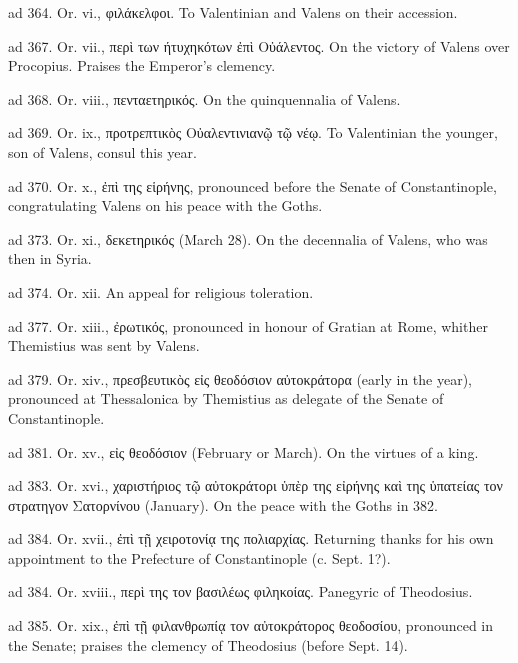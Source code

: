 ad 364.
Or. vi., \textgreek{φιλάκελφοι}. To Valentinian and Valens on their accession.

ad 367.
Or. vii., \textgreek{περ\texthebrew{ὶ} των ήτυχηκότων \texthebrew{ἐ}π\texthebrew{ὶ} Ο\texthebrew{ὐ}άλεντος}. On the victory of Valens over Procopius. Praises the Emperor\texthebrew{}’s clemency.

ad 368.
Or. viii., \textgreek{πενταετηρικός}. On the quinquennalia of Valens.

ad 369.
Or. ix., \textgreek{προτρεπτικ\texthebrew{ὸ}ς Ο\texthebrew{ὐ}αλεντινιαν\texthebrew{ῷ} τ\texthebrew{ῷ} νέ\texthebrew{ῳ}}. To Valentinian the younger, son of Valens, consul this year.

ad 370.
Or. x., \textgreek{\texthebrew{ἐ}π\texthebrew{ὶ} της ε\texthebrew{ἱ}ρήνης}, pronounced before the Senate of Constantinople, congratulating Valens on his peace with the Goths.

ad 373.
Or. xi., \textgreek{δεκετηρικός} (March 28). On the decennalia of Valens, who was then in Syria.

ad 374.
Or. xii. An appeal for religious toleration.

ad 377.
Or. xiii., \textgreek{\texthebrew{ἐ}ρωτικός}, pronounced in honour of Gratian at Rome, whither Themistius was sent by Valens.

ad 379.
Or. xiv., \textgreek{πρεσβευτικ\texthebrew{ὸ}ς ε\texthebrew{ἰ}ς θεοδόσιον α\texthebrew{ὐ}τοκράτορα} (early in the year), pronounced at Thessalonica by Themistius as delegate of the Senate of Constantinople.

ad 381.
Or. xv., \textgreek{ε\texthebrew{ἰ}ς θεοδόσιον} (February or March). On the virtues of a king.

ad 383.
Or. xvi., \textgreek{χαριστήριος τ\texthebrew{ῷ} α\texthebrew{ὐ}τοκράτορι \texthebrew{ὑ}π\texthebrew{ὲ}ρ της ε\texthebrew{ἰ}ρήνης κα\texthebrew{ὶ} της \texthebrew{ὑ}πατείας τον στρατηγον Σατορνίνου} (January). On the peace with the Goths in 382.

ad 384.
Or. xvii., \textgreek{\texthebrew{ἐ}π\texthebrew{ὶ} τ\texthebrew{ῇ} χειροτονί\texthebrew{ᾳ} της πολιαρχίας}. Returning thanks for his own appointment to the Prefecture of Constantinople (c. Sept. 1?).

ad 384.
Or. xviii., \textgreek{περ\texthebrew{ὶ} της τον βασιλέως φιληκοίας}. Panegyric of Theodosius.

ad 385.
Or. xix., \textgreek{\texthebrew{ἐ}π\texthebrew{ὶ} τ\texthebrew{ῇ} φιλανθρωπί\texthebrew{ᾳ} τον α\texthebrew{ὐ}τοκράτορος θεοδοσίου}, pronounced in the Senate; praises the clemency of Theodosius (before Sept. 14).

